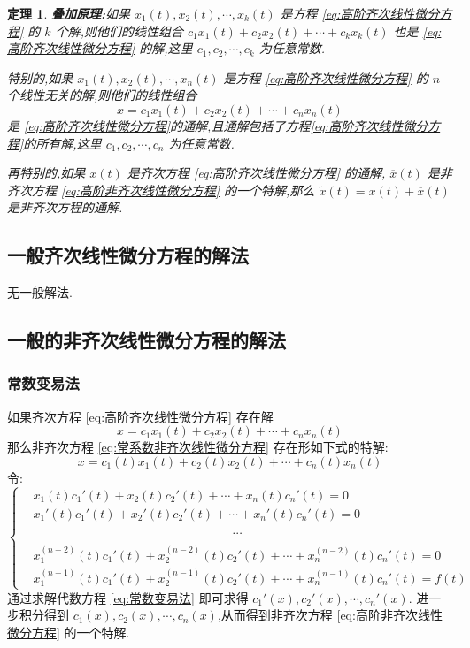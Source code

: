 \documentclass{ctexart}
\newtheorem{theorem}{定理}[section]
\numberwithin{equation}{subsection}
\begin{document}
\begin{theorem}
        {\bf 叠加原理:}如果 $x_1(t),x_2(t),\cdots,x_k(t)$ 是方程 \eqref{eq:高阶齐次线性微分方程} 的 $k$ 个解,则他们的线性组合 $c_1x_1(t)+c_2x_2(t)+\cdots+c_kx_k(t)$ 也是 \eqref{eq:高阶齐次线性微分方程} 的解,这里 $c_1,c_2,\cdots,c_k$ 为任意常数.

        特别的,如果 $x_1(t),x_2(t),\cdots,x_n(t)$ 是方程 \eqref{eq:高阶齐次线性微分方程} 的 $n$ 个线性无关的解,则他们的线性组合 
        \begin{equation}x=c_1x_1(t)+c_2x_2(t)+\cdots+c_nx_n(t)\end{equation} 是 \eqref{eq:高阶齐次线性微分方程}的通解,且通解包括了方程\eqref{eq:高阶齐次线性微分方程}的所有解,这里 $c_1,c_2,\cdots,c_n$ 为任意常数.

        再特别的,如果 $x(t)$ 是齐次方程 \eqref{eq:高阶齐次线性微分方程} 的通解, $\overline{x}(t)$ 是非齐次方程 \eqref{eq:高阶非齐次线性微分方程} 的一个特解,那么 $\widetilde{x}(t)=x(t)+\overline{x}(t)$ 是非齐次方程的通解.
\end{theorem}
\subsection{一般齐次线性微分方程的解法}
无一般解法.
\subsection{一般的非齐次线性微分方程的解法}
\subsubsection{常数变易法}
\label{section:常数变易法3}
如果齐次方程 \eqref{eq:高阶齐次线性微分方程} 存在解
\[x=c_1x_1(t)+c_2x_2(t)+\cdots+c_nx_n(t)\]
那么非齐次方程 \eqref{eq:常系数非齐次线性微分方程} 存在形如下式的特解:
\[x=c_1(t)x_1(t)+c_2(t)x_2(t)+\cdots+c_n(t)x_n(t)\]
令:
\begin{equation}
        \label{eq:常数变易法}\left\{ \begin{aligned}
        &x_1(t)c_1'(t)+x_2(t)c_2'(t)+\cdots+x_n(t)c_n'(t)=0\\
        &x_1'(t)c_1'(t)+x_2'(t)c_2'(t)+\cdots+x_n'(t)c_n'(t)=0\\
        &\phantom{x_1'(t)c_1'(t)+x_2'(t)c_2'(t)+\,\,}\cdots\\
        &x_1^{(n-2)}(t)c_1'(t)+x_2^{(n-2)}(t)c_2'(t)+\cdots+x_n^{(n-2)}(t)c_n'(t)=0\\
        &x_1^{(n-1)}(t)c_1'(t)+x_2^{(n-1)}(t)c_2'(t)+\cdots+x_n^{(n-1)}(t)c_n'(t)=f(t)
        \end{aligned} \right.\end{equation}
通过求解代数方程 \eqref{eq:常数变易法} 即可求得 $c_1'(x),c_2'(x),\cdots,c_n'(x)$. 进一步积分得到 $c_1(x),c_2(x),\cdots,c_n(x)$,从而得到非齐次方程 \eqref{eq:高阶非齐次线性微分方程} 的一个特解.
\end{document}
